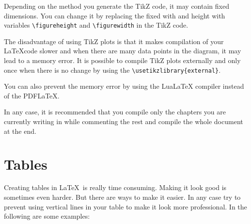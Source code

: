 \begin{QandA}
\begin{answered}
		

	
	Depending on the method you generate the TikZ code, it may contain fixed dimensions. You can change it by replacing the fixed with and height with variables \verb|\figureheight| and \verb|\figurewidth| in the TikZ code.
	
	The disadvantage of using TikZ plots is that it makes compilation of your \LaTeX code slower and when there are many data points in the diagram, it may lead to a memory error. It is possible to compile TikZ plots externally and only once when there is no change by using the \verb|\usetikzlibrary{external}|.
	
	You can also prevent the memory error by using the LuaLaTeX compiler instead of the PDFLaTeX.
	
	In any case, it is recommended that you compile only the chapters you are currently writing in while commenting the rest and compile the whole document at the end.
	\end{answered}		


\end{QandA}




\section{Tables}
\label{sec:Tables}
Creating tables in \LaTeX\ is really time consuming. Making it look good is sometimes even harder. But there are ways to make it easier. In any case try to prevent using vertical lines in your table to make it look more professional. In the following are some examples:

